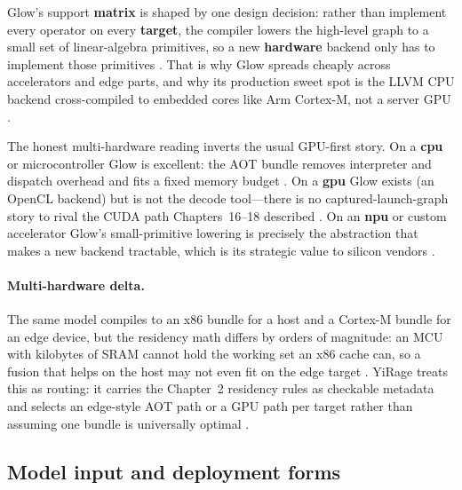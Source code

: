 Glow's support \textbf{matrix} is shaped by one design decision: rather than implement every operator on every \textbf{target}, the compiler lowers the high-level graph to a small set of linear-algebra primitives, so a new \textbf{hardware} backend only has to implement those primitives \citep{rotem2018glow}. That is why Glow spreads cheaply across accelerators and edge parts, and why its production sweet spot is the LLVM CPU backend cross-compiled to embedded cores like Arm Cortex-M, not a server GPU \citep{pytorchglow2024}.

The honest multi-hardware reading inverts the usual GPU-first story. On a \textbf{cpu} or microcontroller Glow is excellent: the AOT bundle removes interpreter and dispatch overhead and fits a fixed memory budget \citep{rotem2018glow,taxbreak2026}. On a \textbf{gpu} Glow exists (an OpenCL backend) but is not the decode tool---there is no captured-launch-graph story to rival the CUDA path Chapters~16--18 described \citep{memoryfloor2026,nvidia2024cudagraphs}. On an \textbf{npu} or custom accelerator Glow's small-primitive lowering is precisely the abstraction that makes a new backend tractable, which is its strategic value to silicon vendors \citep{amd2024xdna,amd2024aie}.

\paragraph{Multi-hardware delta.} The same model compiles to an x86 bundle for a host and a Cortex-M bundle for an edge device, but the residency math differs by orders of magnitude: an MCU with kilobytes of SRAM cannot hold the working set an x86 cache can, so a fusion that helps on the host may not even fit on the edge target \citep{dlbook,amd2024aie}. YiRage treats this as routing: it carries the Chapter~2 residency rules as checkable metadata and selects an edge-style AOT path or a GPU path per target rather than assuming one bundle is universally optimal \citep{yirage2026}.

\subsection{Model input and deployment forms}

